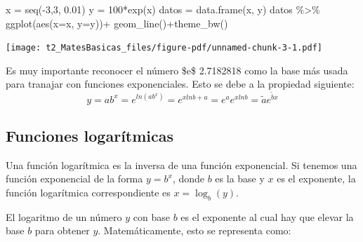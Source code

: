 \documentclass[
  letterpaper,
  DIV=11,
  numbers=noendperiod]{scrreprt}
\newenvironment{Shaded}{\begin{snugshade}}{\end{snugshade}}
\newcommand{\AttributeTok}[1]{\textcolor[rgb]{0.40,0.45,0.13}{#1}}
\newcommand{\DecValTok}[1]{\textcolor[rgb]{0.68,0.00,0.00}{#1}}
\newcommand{\FloatTok}[1]{\textcolor[rgb]{0.68,0.00,0.00}{#1}}
\newcommand{\FunctionTok}[1]{\textcolor[rgb]{0.28,0.35,0.67}{#1}}
\newcommand{\NormalTok}[1]{\textcolor[rgb]{0.00,0.23,0.31}{#1}}
\newcommand{\OtherTok}[1]{\textcolor[rgb]{0.00,0.23,0.31}{#1}}
\newcommand{\SpecialCharTok}[1]{\textcolor[rgb]{0.37,0.37,0.37}{#1}}
\begin{document}
\begin{Shaded}
\begin{Highlighting}[]
\NormalTok{x }\OtherTok{=} \FunctionTok{seq}\NormalTok{(}\SpecialCharTok{{-}}\DecValTok{3}\NormalTok{,}\DecValTok{3}\NormalTok{, }\FloatTok{0.01}\NormalTok{)}
\NormalTok{y }\OtherTok{=} \DecValTok{100}\SpecialCharTok{*}\FunctionTok{exp}\NormalTok{(x)}
\NormalTok{datos }\OtherTok{=} \FunctionTok{data.frame}\NormalTok{(x, y)}
\NormalTok{datos }\SpecialCharTok{\%\textgreater{}\%} \FunctionTok{ggplot}\NormalTok{(}\FunctionTok{aes}\NormalTok{(}\AttributeTok{x=}\NormalTok{x, }\AttributeTok{y=}\NormalTok{y))}\SpecialCharTok{+}
  \FunctionTok{geom\_line}\NormalTok{()}\SpecialCharTok{+}\FunctionTok{theme\_bw}\NormalTok{()}
\end{Highlighting}
\end{Shaded}

\texttt{[image: t2\_MatesBasicas\_files/figure-pdf/unnamed-chunk-3-1.pdf]}

\begin{tcolorbox}[enhanced jigsaw, colframe=quarto-callout-note-color-frame, coltitle=black, colback=white, toptitle=1mm, bottomrule=.15mm, bottomtitle=1mm, leftrule=.75mm, opacityback=0, rightrule=.15mm, titlerule=0mm, title=\textcolor{quarto-callout-note-color}{\faInfo}\hspace{0.5em}{Nota}, arc=.35mm, toprule=.15mm, left=2mm, opacitybacktitle=0.6, breakable, colbacktitle=quarto-callout-note-color!10!white]

Es muy importante reconocer el número \$e\approx \$ 2.7182818 como la
base más usada para tranajar con funciones exponenciales. Esto se debe a
la propiedad siguiente:
\[y = ab^x= e^{ln(ab^x)}=e^{xln b + a}=e^ae^{xln b}=\tilde{a}e^{\tilde{b}x}\]

\end{tcolorbox}

\subsection{Funciones logarítmicas}\label{funciones-logaruxedtmicas}

Una función logarítmica es la inversa de una función exponencial. Si
tenemos una función exponencial de la forma \(y=b^x\), donde \(b\) es la
base y \(x\) es el exponente, la función logarítmica correspondiente es
\(x=\log_b(y)\).

El logaritmo de un número \(y\) con base \(b\) es el exponente al cual
hay que elevar la base \(b\) para obtener \(y\). Matemáticamente, esto
se representa como:
\end{document}
